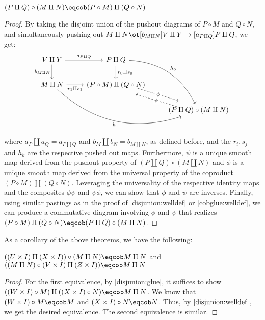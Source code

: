 \begin{thm}\label{disjunion:glue}
$(P \amalg Q) \circ (M \amalg N) \eqcob (P \circ M) \amalg (Q \circ N)$
\end{thm}
\begin{proof}
By taking the disjoint union of the pushout diagrams of $P \circ M$ and
$Q \circ N$, and simultaneously pushing out
$M \amalg N \ot[b_{M \amalg N}] V \amalg Y \to[a_{P \amalg Q}] P \amalg Q$, we
get:
\begin{eqnarray*}
\begin{tikzcd}
V \amalg Y
  \arrow[r, "a_{P \amalg Q}" above]
  \arrow[d, "b_{M \amalg N}" left]
& P \amalg Q
  \arrow[d, "r_0 \amalg s_0" right]
  \arrow[rdd, bend left, "h_0"]
& \\
M \amalg N
  \arrow[r, "r_1 \amalg s_1" below]
  \arrow[rrd, bend right, "h_1" below]
& (P \circ M) \amalg (Q \circ N)
  \arrow[rd, dashed, shift left=1ex, "\phi" description]
& \\
& & (P \amalg Q) \circ (M \amalg N)
  \arrow[ul, dashed, shift left=1ex, "\psi" description]
\end{tikzcd}
\end{eqnarray*}
where $a_{P} \amalg a_{Q} = a_{P \amalg Q}$ and
$b_{M} \amalg b_{N} = b_{M \amalg N}$, as defined before,
and the $r_i, s_j$ and $h_k$ are the respective pushed out maps. Furthermore,
$\psi$ is a unique smooth map derived from the pushout property of
$(P \amalg Q) \circ (M \amalg N)$ and $\phi$ is a unique smooth map derived from
the universal property of the coproduct $(P \circ M) \amalg (Q \circ N)$.
Leveraging the universality of the respective identity maps and the composites
$\phi\psi$ and $\psi\phi$, we can show that $\phi$ and $\psi$ are inverses.
Finally, using similar pastings as in the proof of \ref{disjunion:welldef} or
\ref{cobglue:welldef}, we can produce a commutative diagram involving $\phi$ and
$\psi$ that realizes $(P \circ M) \amalg (Q \circ N) \eqcob
(P \amalg Q) \circ (M \amalg N)$.
\end{proof}

As a corollary of the above theorems, we have the following:
\begin{thm}\label{disjunion:id}
$((U \times I) \amalg (X \times I)) \circ (M \amalg N) \eqcob M \amalg N$
and $((M \amalg N) \circ (V \times I) \amalg (Z \times I)) \eqcob M \amalg N$
\end{thm}
\begin{proof}
For the first equivalence, by \ref{disjunion:glue}, it suffices to
show $((W \times I) \circ M) \amalg ((X \times I) \circ N) \eqcob M \amalg N$.
We know that $(W \times I) \circ M \eqcob M$ and
$(X \times I) \circ N \eqcob N$. Thus, by $\ref{disjunion:welldef}$, we get the
desired equivalence. The second equivalence is similar.
\end{proof}

